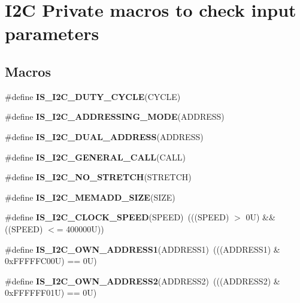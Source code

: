 \hypertarget{group___i2_c___i_s___r_t_c___definitions}{}\section{I2C Private macros to check input parameters}
\label{group___i2_c___i_s___r_t_c___definitions}
\subsection*{Macros}
\begin{DoxyCompactItemize}
\item 
\#define {\bfseries I\+S\+\_\+\+I2\+C\+\_\+\+D\+U\+T\+Y\+\_\+\+C\+Y\+C\+LE}(C\+Y\+C\+LE)
\item 
\#define {\bfseries I\+S\+\_\+\+I2\+C\+\_\+\+A\+D\+D\+R\+E\+S\+S\+I\+N\+G\+\_\+\+M\+O\+DE}(A\+D\+D\+R\+E\+SS)
\item 
\#define {\bfseries I\+S\+\_\+\+I2\+C\+\_\+\+D\+U\+A\+L\+\_\+\+A\+D\+D\+R\+E\+SS}(A\+D\+D\+R\+E\+SS)
\item 
\#define {\bfseries I\+S\+\_\+\+I2\+C\+\_\+\+G\+E\+N\+E\+R\+A\+L\+\_\+\+C\+A\+LL}(C\+A\+LL)
\item 
\#define {\bfseries I\+S\+\_\+\+I2\+C\+\_\+\+N\+O\+\_\+\+S\+T\+R\+E\+T\+CH}(S\+T\+R\+E\+T\+CH)
\item 
\#define {\bfseries I\+S\+\_\+\+I2\+C\+\_\+\+M\+E\+M\+A\+D\+D\+\_\+\+S\+I\+ZE}(S\+I\+ZE)
\item 
\mbox{\label{group___i2_c___i_s___r_t_c___definitions_gae0d731df1b264d853703716c29309b9b}} 
\#define {\bfseries I\+S\+\_\+\+I2\+C\+\_\+\+C\+L\+O\+C\+K\+\_\+\+S\+P\+E\+ED}(S\+P\+E\+ED)~(((S\+P\+E\+ED) $>$ 0\+U) \&\& ((\+S\+P\+E\+E\+D) $<$= 400000\+U))
\item 
\mbox{\label{group___i2_c___i_s___r_t_c___definitions_gad84e8b9523d45b6105b4d5cb68994a79}} 
\#define {\bfseries I\+S\+\_\+\+I2\+C\+\_\+\+O\+W\+N\+\_\+\+A\+D\+D\+R\+E\+S\+S1}(A\+D\+D\+R\+E\+S\+S1)~(((A\+D\+D\+R\+E\+S\+S1) \& 0x\+F\+F\+F\+F\+F\+C00\+U) == 0\+U)
\item 
\mbox{\label{group___i2_c___i_s___r_t_c___definitions_ga83001d53612b83ee90730d3bb2732537}} 
\#define {\bfseries I\+S\+\_\+\+I2\+C\+\_\+\+O\+W\+N\+\_\+\+A\+D\+D\+R\+E\+S\+S2}(A\+D\+D\+R\+E\+S\+S2)~(((A\+D\+D\+R\+E\+S\+S2) \& 0x\+F\+F\+F\+F\+F\+F01\+U) == 0\+U)

\end{DoxyCompactItemize}
